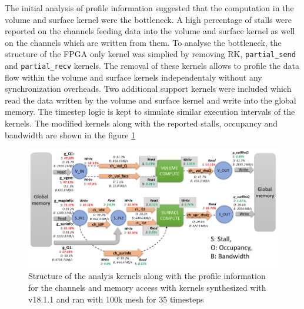 The initial analysis of profile information suggested that the computation in the
volume and surface kernel were the bottleneck. A high percentage of stalls were
reported on the channels feeding data into the volume and surface kernel as well
on the channels which are written from them. To analyse the bottleneck, the
structure of the FPGA only kernel was simplied by removing RK, \texttt{partial\_send}
and \texttt{partial\_recv} kernels. The removal of these kernels allows to profile
the data flow within the volume and surface kernels independentaly without any
synchronization overheads. Two additional support kernels were included which
read the data written by the volume and surface kernel and write into the
global memory. The timestep logic is kept to simulate similar execution
intervals of the kernels. The modified kernels along with the reported
stalls, occupancy and bandwidth are shown in the figure \ref{fig:prof_analyis}
\begin{figure}[]%
    \centering
    \includegraphics[width=1.0\textwidth]{images/bottleneck_analysis_2}
    \caption{Structure of the analyis kernels along with the profile
    information for the channels and memory access with kernels synthesized
    with v18.1.1 and ran with 100k mesh for 35 timesteps}
    \label{fig:prof_analyis}
\end{figure}

